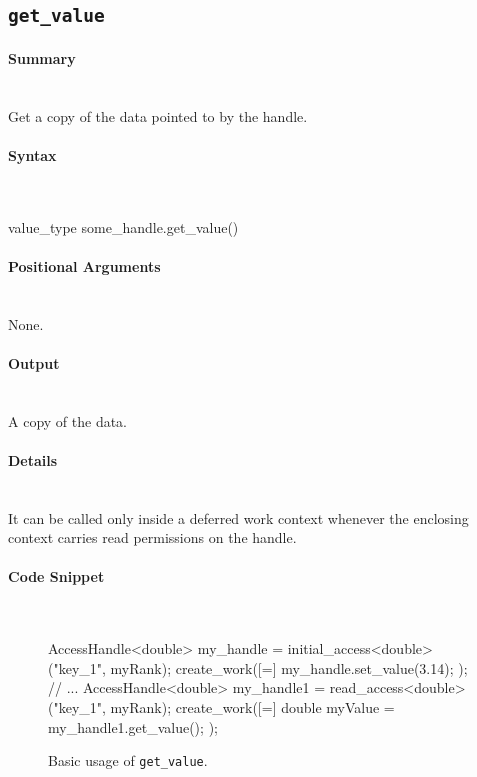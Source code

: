 \subsection{\texttt{get\_value}}

\paragraph{Summary} \mbox{}\\
Get a copy of the data pointed to by the handle.

\paragraph{Syntax}\mbox{}\\
\begin{CppCode}
value_type some_handle.get_value()
\end{CppCode}

\paragraph{Positional Arguments}\mbox{}\\ 
None.

\paragraph{Output}\mbox{}\\ 
A copy of the data.  

\paragraph{Details}\mbox{}\\ 
It can be called only inside a deferred work context whenever 
the enclosing context carries read permissions on the handle.


\paragraph{Code Snippet}\mbox{}\\ 
\begin{figure}[!h]
\begin{CppCodeNumb}
AccessHandle<double> my_handle = initial_access<double>("key_1", myRank);
create_work([=]{
  my_handle.set_value(3.14);
});
// ...
AccessHandle<double> my_handle1 = read_access<double>("key_1", myRank);
create_work([=]{
	double myValue = my_handle1.get_value();
});
\end{CppCodeNumb}
\label{fig:fe_api_get_value}
\caption{Basic usage of \texttt{get\_value}.}
\end{figure}




